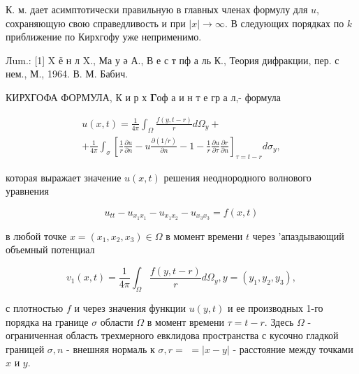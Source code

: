 \documentclass[10pt]{article}
\begin{document}
К. м. дает асимптотически правильную в главных членах формулу для $u$, сохраняющую свою справедливость и при $|x| \rightarrow \infty$. В следующих порядках по $k$ приближение по Кирхгофу уже неприменимо.



Лum.: [1] X ё н л X., Ма у ә А., В е с т пф а ль К., Теория дифракции, пер. с нем., М., 1964. В. М. Бабич.



КИРХГОФА ФОРМУЛА, К и р х $\boldsymbol{\Gamma} о ф$ а и н т е гр а л,- формула



\[

\begin{gathered}

u(x, t)=\frac{1}{4 \pi} \int_{\Omega} \frac{f(y, t-r)}{r} d \Omega_{y}+ \\

+\frac{1}{4 \pi} \int_{\sigma}\left[\frac{1}{r} \frac{\partial u}{\partial n}-u \frac{\partial(1 / r)}{\partial n}-1-\frac{1}{r} \frac{\partial u}{\partial \tau} \frac{\partial r}{\partial n}\right]_{\tau=t-r} d \sigma_{y},

\end{gathered}

\]



которая выражает значение $u(x, t)$ решения неоднородного волнового уравнения



\[

u_{t t}-u_{x_{1} x_{1}}-u_{x_{1} x_{2}}-u_{x_{3} x_{3}}=f(x, t)

\]



в любой точке $x=\left(x_{1}, x_{2}, x_{3}\right) \in \Omega$ в момент времени $t$ через 'апаздывающий объемный потенциал



\[

v_{1}(x, t)=\frac{1}{4 \pi} \int_{\Omega} \frac{f(y, t-r)}{r} d \Omega_{y}, y=\left(y_{1}, y_{2}, y_{3}\right),

\]



с плотностью $f$ и через значения функции $u(y, t)$ и ее производных 1-го порядка на границе $\sigma$ области $\Omega$ в момент времени $\tau=t-r$. Здесь $\Omega$ - ограниченная область трехмерного евклидова пространства с кусочно гладкой границей $\sigma, n$ - внешняя нормаль к $\sigma, r=$ $=|x-y|$ - расстояние между точками $x$ и $y$.
\end{document}
